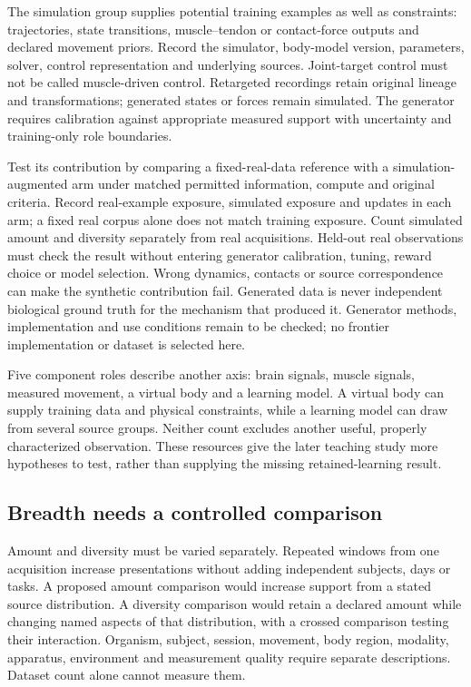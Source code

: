 The simulation group supplies potential training examples as well as constraints: trajectories, state transitions, muscle--tendon or contact-force outputs and declared movement priors. Record the simulator, body-model version, parameters, solver, control representation and underlying sources. Joint-target control must not be called muscle-driven control. Retargeted recordings retain original lineage and transformations; generated states or forces remain simulated. The generator requires calibration against appropriate measured support with uncertainty and training-only role boundaries.

Test its contribution by comparing a fixed-real-data reference with a simulation-augmented arm under matched permitted information, compute and original criteria. Record real-example exposure, simulated exposure and updates in each arm; a fixed real corpus alone does not match training exposure. Count simulated amount and diversity separately from real acquisitions. Held-out real observations must check the result without entering generator calibration, tuning, reward choice or model selection. Wrong dynamics, contacts or source correspondence can make the synthetic contribution fail. Generated data is never independent biological ground truth for the mechanism that produced it. Generator methods, implementation and use conditions remain to be checked; no frontier implementation or dataset is selected here.

Five component roles describe another axis: brain signals, muscle signals, measured movement, a virtual body and a learning model. A virtual body can supply training data and physical constraints, while a learning model can draw from several source groups. Neither count excludes another useful, properly characterized observation. These resources give the later teaching study more hypotheses to test, rather than supplying the missing retained-learning result.

\subsection{Breadth needs a controlled comparison}

Amount and diversity must be varied separately. Repeated windows from one acquisition increase presentations without adding independent subjects, days or tasks. A proposed amount comparison would increase support from a stated source distribution. A diversity comparison would retain a declared amount while changing named aspects of that distribution, with a crossed comparison testing their interaction. Organism, subject, session, movement, body region, modality, apparatus, environment and measurement quality require separate descriptions. Dataset count alone cannot measure them.

